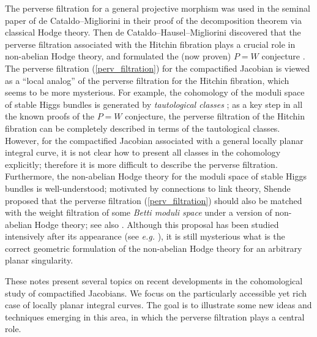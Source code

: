 \documentclass{pspum-l}
\theoremstyle{plain}
\theoremstyle{definition}
\theoremstyle{remark}
\begin{document}
The perverse filtration for a general projective morphism was used in the seminal paper of de Cataldo--Migliorini \cite{dCM0} in their proof of the decomposition theorem \cite{BBDG} via classical Hodge theory. Then de Cataldo--Hausel--Migliorini \cite{dCHM} discovered that the perverse filtration associated with the Hitchin fibration plays a crucial role in non-abelian Hodge theory, and formulated the (now proven) $P=W$ conjecture \cite{MS_PW, HMMS, MSY, Hoskins}. The perverse filtration (\ref{perv_filtration}) for the compactified Jacobian is viewed as a ``local analog'' of the perverse filtration for the Hitchin fibration, which seems to be more mysterious. For example, the cohomology of the moduli space of stable Higgs bundles is generated by \emph{tautological classes} \cite{Markman}; as a key step in all the known proofs of the $P=W$ conjecture, the perverse filtration of the Hitchin fibration can be completely described in terms of the tautological classes. However, for the compactified Jacobian associated with a general locally planar integral curve, it is not clear how to present all classes in the cohomology explicitly; therefore it is more difficult to describe the perverse filtration. Furthermore, the non-abelian Hodge theory for the moduli space of stable Higgs bundles is well-understood; motivated by connections to link theory, Shende \cite{Sh0} proposed that the perverse filtration (\ref{perv_filtration}) should also be matched with the weight filtration of some \emph{Betti moduli space} under a version of non-abelian Hodge theory; see also \cite[Conjecture 6.16 and Remark 6.17]{GKS}. Although this proposal has been studied intensively after its appearance (see \emph{e.g.} \cite{BBAMY, Trinh2, Trinh}), it is still mysterious what is the correct geometric formulation of the non-abelian Hodge theory for an arbitrary planar singularity. 


These notes present several topics on recent developments in the cohomological study of compactified Jacobians. We focus on the particularly accessible yet rich case of locally planar integral curves. The goal is to illustrate some new ideas and techniques emerging in this area, in which the perverse filtration plays a central role.
\end{document}
